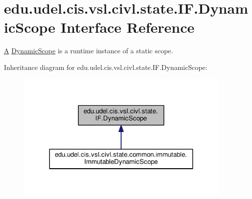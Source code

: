 \hypertarget{interfaceedu_1_1udel_1_1cis_1_1vsl_1_1civl_1_1state_1_1IF_1_1DynamicScope}{}\section{edu.\+udel.\+cis.\+vsl.\+civl.\+state.\+I\+F.\+Dynamic\+Scope Interface Reference}
\label{interfaceedu_1_1udel_1_1cis_1_1vsl_1_1civl_1_1state_1_1IF_1_1DynamicScope}


\hyperlink{structA}{A} \hyperlink{interfaceedu_1_1udel_1_1cis_1_1vsl_1_1civl_1_1state_1_1IF_1_1DynamicScope}{Dynamic\+Scope} is a runtime instance of a static scope.  




Inheritance diagram for edu.\+udel.\+cis.\+vsl.\+civl.\+state.\+I\+F.\+Dynamic\+Scope\+:
\nopagebreak
\begin{figure}[H]
\begin{center}
\leavevmode
\includegraphics[width=299pt]{interfaceedu_1_1udel_1_1cis_1_1vsl_1_1civl_1_1state_1_1IF_1_1DynamicScope__inherit__graph}
\end{center}
\end{figure}
